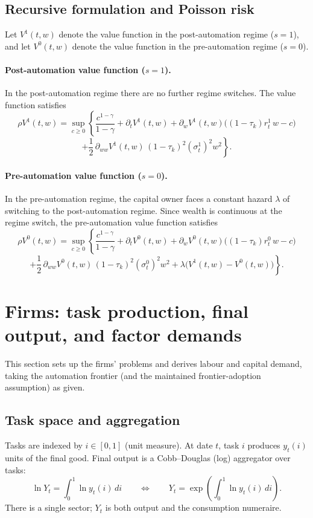 \documentclass{article}
\begin{document}
\subsection{Recursive formulation and Poisson risk}

Let $V^{1}(t,w)$ denote the value function in the post-automation regime ($s=1$), and let $V^{0}(t,w)$ denote the value function in the pre-automation regime ($s=0$).

\paragraph{Post-automation value function ($s=1$).}
In the post-automation regime there are no further regime switches. The value function satisfies
$$
\rho V^{1}(t,w)
=
\sup_{c \ge 0}
\left\{
\frac{c^{1-\gamma}}{1-\gamma}
+
\partial_t V^{1}(t,w)
+
\partial_w V^{1}(t,w)\Big((1-\tau_k) r_t^{1}\, w - c\Big)
\right.
$$
$$
\left.
+
\frac{1}{2}\,\partial_{ww} V^{1}(t,w)\,(1-\tau_k)^2 (\sigma_t^{1})^2 w^2
\right\}.
$$

\paragraph{Pre-automation value function ($s=0$).}
In the pre-automation regime, the capital owner faces a constant hazard $\lambda$ of switching to the post-automation regime. Since wealth is continuous at the regime switch, the pre-automation value function satisfies
$$
\rho V^{0}(t,w)
=
\sup_{c \ge 0}
\left\{
\frac{c^{1-\gamma}}{1-\gamma}
+
\partial_t V^{0}(t,w)
+
\partial_w V^{0}(t,w)\Big((1-\tau_k) r_t^{0}\, w - c\Big)
\right.
$$
$$
\left.
+
\frac{1}{2}\,\partial_{ww} V^{0}(t,w)\,(1-\tau_k)^2 (\sigma_t^{0})^2 w^2
+
\lambda\Big(V^{1}(t,w)-V^{0}(t,w)\Big)
\right\}.
$$

\section{Firms: task production, final output, and factor demands}
\label{sec:firms}

This section sets up the firms’ problems and derives labour and capital demand, taking the automation frontier (and the maintained frontier-adoption assumption) as given.

\subsection{Task space and aggregation}

Tasks are indexed by $i \in [0,1]$ (unit measure). At date $t$, task $i$ produces $y_t(i)$ units of the final good. Final output is a Cobb--Douglas (log) aggregator over tasks:
$$
\ln Y_t = \int_0^1 \ln y_t(i)\,di
\qquad \Longleftrightarrow \qquad
Y_t = \exp\left(\int_0^1 \ln y_t(i)\,di\right).
$$
There is a single sector; $Y_t$ is both output and the consumption numeraire.
\end{document}
